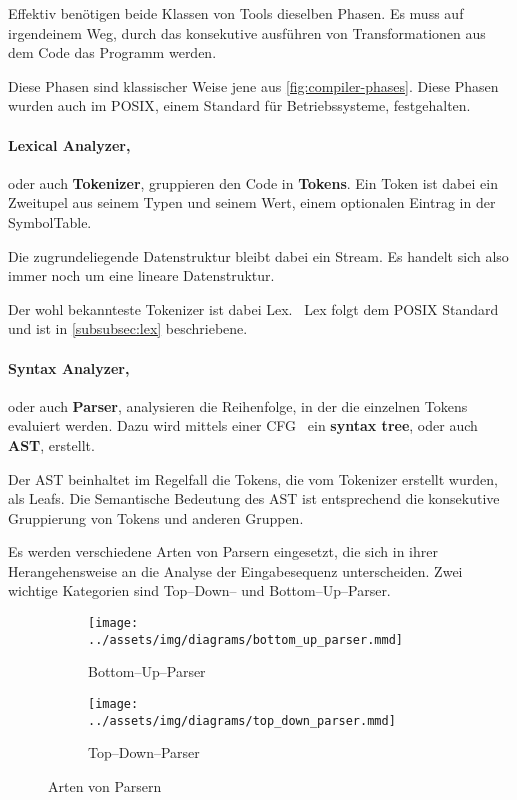 Effektiv benötigen beide Klassen von Tools dieselben Phasen.
Es muss auf irgendeinem Weg, durch das konsekutive ausführen von Transformationen aus dem Code das Programm werden.

Diese Phasen sind klassischer Weise jene aus \autoref{fig:compiler-phases}.
Diese Phasen wurden auch im \ac{POSIX}, einem Standard für Betriebssysteme, festgehalten.~\autocite{ieee-sa-1993}

\paragraph{Lexical Analyzer,} oder auch \textbf{Tokenizer}, gruppieren den Code in \textbf{Tokens}.
Ein Token ist dabei ein Zweitupel aus seinem Typen und seinem Wert, einem optionalen Eintrag in der SymbolTable.

Die zugrundeliegende Datenstruktur bleibt dabei ein Stream.
Es handelt sich also immer noch um eine lineare Datenstruktur.

Der wohl bekannteste Tokenizer ist dabei Lex.~\autocite{wikipedia-contributors-2024G}
Lex folgt dem \ac{POSIX} Standard und ist in \autoref{subsubsec:lex} beschriebene.

\paragraph{Syntax Analyzer,} oder auch \textbf{Parser}, analysieren die Reihenfolge, in der die einzelnen Tokens evaluiert werden.
Dazu wird mittels einer \ac{CFG}~\autocite{wikipedia-contributors-2024H} ein \textbf{syntax tree}, oder auch \textbf{\ac{AST}}, erstellt.

Der \ac{AST} beinhaltet im Regelfall die Tokens, die vom Tokenizer erstellt wurden, als Leafs.
Die Semantische Bedeutung des \ac{AST} ist entsprechend die konsekutive Gruppierung von Tokens und anderen Gruppen.

Es werden verschiedene Arten von Parsern eingesetzt, die sich in ihrer Herangehensweise an die Analyse der Eingabesequenz unterscheiden.
Zwei wichtige Kategorien sind Top--Down-- und Bottom--Up--Parser.
\begin{figure}[ht]
    \begin{subfigure}[c]{0.5\textwidth}
        \begin{center}
            \texttt{[image: ../assets/img/diagrams/bottom\_up\_parser.mmd]}
        \end{center}
        \caption{Bottom--Up--Parser}
        \label{subfig:bottom-up-parser}
    \end{subfigure}
    \begin{subfigure}[c]{0.5\textwidth}
        \begin{center}
            \texttt{[image: ../assets/img/diagrams/top\_down\_parser.mmd]}
        \end{center}
        \caption{Top--Down--Parser}
        \label{subfig:top-down-parser}
    \end{subfigure}
    \caption{Arten von Parsern}
    \label{fig:parser-types}
\end{figure}

